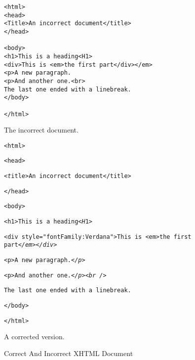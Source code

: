 \begin{figure}
\label{fig:xhtmlDocumentExample}

\begin{verbatim}
<html>
<head>
<Title>An incorrect document</title>
</head>

<body>
<h1>This is a heading<H1>
<div>This is <em>the first part</div></em>
<p>A new paragraph.
<p>And another one.<br>
The last one ended with a linebreak.
</body>

</html>
\end{verbatim}


The incorrect document.


\verb-<html>-

\verb-<head>-

\verb-<-\emph{\texttt{t}}\verb-itle>An incorrect document</title>-

\verb-</head>-

\verb-<body>-

\verb-<h1>This is a heading<-\emph{\texttt{H}}\verb-1>-
     
\verb-<div style=-\emph{\texttt{"}}\verb-fontFamily:Verdana-\emph{\texttt{"}}\verb->This is <em>the first part-\emph{\texttt{</em></div>}}

\verb-<p>A new paragraph.-\emph{\texttt{</p>}}

\verb-<p>And another one.-\emph{\texttt{</p><br />}}

\verb-The last one ended with a linebreak.-

\verb-</body>-

\verb-</html>-

A corrected version.

\caption{Correct And Incorrect XHTML Document}
\end{figure}

